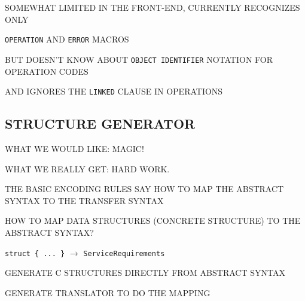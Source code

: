 \begin{bwslide}

\begin{nrtc}
\item	SOMEWHAT LIMITED IN THE FRONT-END, CURRENTLY RECOGNIZES ONLY
    \begin{nrtc}
    \item	\verb"OPERATION" AND \verb"ERROR" MACROS
    \end{nrtc}

\item	BUT DOESN'T KNOW ABOUT \verb"OBJECT IDENTIFIER" NOTATION FOR OPERATION
	CODES

\item	AND IGNORES THE \verb"LINKED" CLAUSE IN OPERATIONS
\end{nrtc}
\end{bwslide}


\begin{bwslide}
\part*	{STRUCTURE GENERATOR}\bf

\begin{nrtc}
\item	WHAT WE WOULD LIKE: MAGIC!

\item	WHAT WE REALLY GET: HARD WORK.
\end{nrtc}
\end{bwslide}


\begin{bwslide}

\begin{nrtc}
\item	THE BASIC ENCODING RULES SAY HOW TO MAP THE ABSTRACT SYNTAX TO THE
	TRANSFER SYNTAX

\item	HOW TO MAP DATA STRUCTURES (CONCRETE STRUCTURE) TO THE ABSTRACT SYNTAX?
    \begin{nrtc}
    \item	\verb"struct { ... }" $\rightarrow$ \verb"ServiceRequirements"
    \end{nrtc}
\end{nrtc}
\end{bwslide}


\begin{bwslide}

\begin{nrtc}
\item	GENERATE C STRUCTURES DIRECTLY FROM ABSTRACT SYNTAX

\item	GENERATE TRANSLATOR TO DO THE MAPPING
\end{nrtc}
\end{bwslide}


